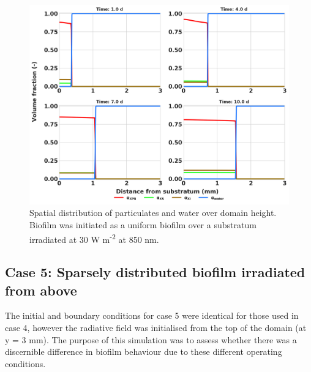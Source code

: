 \begin{figure}[H]
    \centering
    \includegraphics[width=\textwidth,height=0.45\textheight]{Chap4/methods/output/case5.png}
    \caption{Spatial distribution of particulates and water over domain height. Biofilm was initiated as a uniform biofilm over a substratum irradiated at 30 W m\textsuperscript{-2} at 850 nm.} 
    \label{fig:case5_dist_frac}
\end{figure}









\subsection{Case 5: Sparsely distributed biofilm irradiated from above}
The initial and boundary conditions for case 5 were identical for those used in case 4, however the radiative field was initialised from the top of the domain (at y = 3 mm). The purpose of this simulation was to assess whether there was a discernible difference in biofilm behaviour due to these different operating conditions. 

